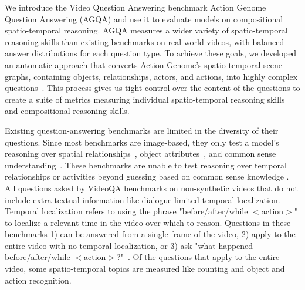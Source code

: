 We introduce the Video Question Answering benchmark Action Genome Question Answering (AGQA) and use it to evaluate models on compositional spatio-temporal reasoning. AGQA measures a wider variety of spatio-temporal reasoning skills than existing benchmarks on real world  videos, with balanced answer distributions for each question type. To achieve these goals, we developed  an automatic approach that converts Action Genome’s spatio-temporal scene graphs, containing objects, relationships, actors, and actions, into highly complex questions~\cite{ji2020action}. This process gives us tight control over the content of the questions to create a suite of metrics measuring individual spatio-temporal reasoning skills and compositional reasoning skills. 

Existing question-answering benchmarks are limited in the diversity of their questions. Since most benchmarks are image-based, they only test a model's reasoning over spatial relationships~\cite{johnson2017clevr,hudson2019gqa,antol2015vqa,goyal2017making,krishna2017visual,zhu2016visual7w}, object attributes~\cite{johnson2017clevr,hudson2019gqa, antol2015vqa,goyal2017making,krishna2017visual}, and common sense understanding~\cite{zellers2019recognition,antol2015vqa,krishna2017visual}. These benchmarks are unable to test reasoning over temporal relationships or activities beyond guessing based on common sense knowledge \cite{zellers2019recognition}. All questions asked by VideoQA benchmarks on non-synthetic videos that do not include extra textual information like dialogue limited temporal localization. Temporal localization refers to using the phrase "before/after/while $<$action$>$" to localize a relevant time in the video over which to reason. Questions in these benchmarks 1) can be answered from a single frame of the video, 2) apply to the entire video with no temporal localization, or 3) ask "what happened before/after/while $<$action$>$?"~\cite{jang2017tgif,xu2017video, maharaj2017dataset, zeng2016leveraging, yu2019activitynet}. Of the questions that apply to the entire video, some spatio-temporal topics are measured like counting and object and action recognition. 

